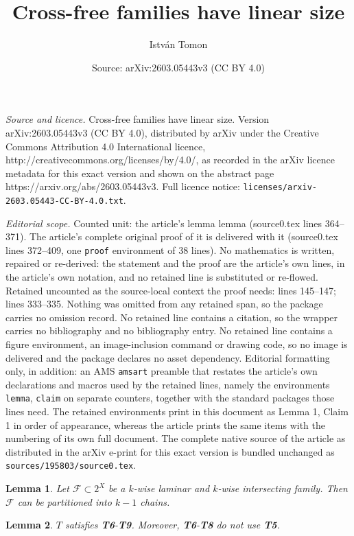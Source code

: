 \documentclass[10pt,a4paper]{amsart}
\title{Cross-free families have linear size}
\author{Istv\'an Tomon}
\date{Source: arXiv:2603.05443v3 (CC BY 4.0)}
\newtheorem{lemma}{Lemma}
\newcommand{\cF}{\mathcal{F}}
\begin{document}
\maketitle

\noindent\emph{Source and licence.} Cross-free families have linear size. Version arXiv:2603.05443v3 (CC BY 4.0), distributed by arXiv under the Creative Commons Attribution 4.0 International licence, http://creativecommons.org/licenses/by/4.0/, as recorded in the arXiv licence metadata for this exact version and shown on the abstract page https://arxiv.org/abs/2603.05443v3. Full licence notice: \texttt{licenses/arxiv-2603.05443-CC-BY-4.0.txt}.\par\smallskip

\noindent\textit{Editorial scope.} Counted unit: the article's lemma lemma (source0.tex lines 364--371). The article's complete original proof of it is delivered with it (source0.tex lines 372--409, one \texttt{proof} environment of 38 lines). No mathematics is written, repaired or re-derived: the statement and the proof are the article's own lines, in the article's own notation, and no retained line is substituted or re-flowed.  Retained uncounted as the source-local context the proof needs: lines 145--147; lines 333--335.  Nothing was omitted from any retained span, so the package carries no omission record.  No retained line contains a citation, so the wrapper carries no bibliography and no bibliography entry.  No retained line contains a figure environment, an image-inclusion command or drawing code, so no image is delivered and the package declares no asset dependency.  Editorial formatting only, in addition: an AMS \texttt{amsart} preamble that restates the article's own declarations and macros used by the retained lines, namely the environments \texttt{lemma}, \texttt{claim} on separate counters, together with the standard packages those lines need.  The retained environments print in this document as Lemma 1, Claim 1 in order of appearance, whereas the article prints the same items with the numbering of its own full document.  The complete native source of the article as distributed in the arXiv e-print for this exact version is bundled unchanged as \texttt{sources/195803/source0.tex}.
\begin{lemma}\label{lemma:dilworth}
Let $\cF\subset 2^X$ be a $k$-wise laminar and $k$-wise intersecting family. Then $\mathcal{F}$ can be partitioned into $k-1$ chains.
\end{lemma}

\begin{lemma}\label{lemma:T}
$T$ satisfies \textbf{T6}-\textbf{T9}. Moreover, \textbf{T6}-\textbf{T8} do not use \textbf{T5}.
\end{lemma}
\end{document}
